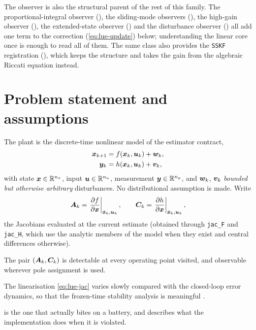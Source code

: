 The observer is also the structural parent of the rest of this family.  The
proportional-integral observer (), the sliding-mode observers
(), the high-gain observer (), the extended-state
observer () and the disturbance observer () all add one term to the
correction (\ref{eq:lue-update}) below; understanding the linear core once is enough to read all
of them.  The same class also provides the \texttt{SSKF} registration (), which
keeps the structure and takes the gain from the algebraic Riccati equation instead.

\section{Problem statement and assumptions}
The plant is the discrete-time nonlinear model of the estimator contract,
\begin{align}
\bm{x}_{k+1} &= f(\bm{x}_k, \bm{u}_k) + \bm{w}_k , \label{eq:lue-plant-f}\\
\bm{y}_k     &= h(\bm{x}_k, \bm{u}_k) + \bm{v}_k , \label{eq:lue-plant-h}
\end{align}
with state $\bm{x}\in\mathbb{R}^{n_x}$, input $\bm{u}\in\mathbb{R}^{n_u}$, measurement $\bm{y}\in\mathbb{R}^{n_y}$, and
$\bm{w}_k$, $\bm{v}_k$ \emph{bounded but otherwise arbitrary} disturbances.  No distributional
assumption is made.  Write
\begin{equation}
\bm{A}_k = \left.\frac{\partial f}{\partial \bm{x}}\right|_{\hat{\bm{x}}_k,\bm{u}_k} , \qquad
\bm{C}_k = \left.\frac{\partial h}{\partial \bm{x}}\right|_{\hat{\bm{x}}_k,\bm{u}_k} ,
\label{eq:lue-jac}
\end{equation}
the Jacobians evaluated at the current estimate (obtained through \texttt{jac\_F} and
\texttt{jac\_H}, which use the analytic members of the model when they exist and central
differences otherwise).

\begin{assumption}[Detectability]\label{as:lue-detect}
The pair $(\bm{A}_k,\bm{C}_k)$ is detectable at every operating point visited, and observable wherever
pole assignment is used.
\end{assumption}
\begin{assumption}\label{as:lue-slow}
The linearisation \eqref{eq:lue-jac} varies slowly compared with the closed-loop error dynamics,
so that the frozen-time stability analysis is meaningful \cite{shamma1990gain}.
\end{assumption}
 is the one that actually bites on a battery, and 
describes what the implementation does when it is violated.

